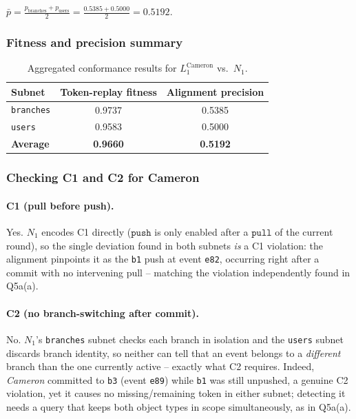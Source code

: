 \documentclass[11pt,a4paper]{article}
\newcommand{\otBranches}{\texttt{branches}}
\newcommand{\otUsers}{\texttt{users}}
\newcommand{\etPull}{\texttt{pull}}
\newcommand{\etPush}{\texttt{push}}
\newcommand{\None}{$N_1$}
\newcommand{\userCameron}{\textit{Cameron}}
\newcommand{\logLuone}{$L_1^{\text{Cameron}}$}
\begin{document}
$\bar{p} = \frac{p_{\text{branches}} + p_{\text{users}}}{2}
      = \frac{0.5385 + 0.5000}{2} = 0.5192$.

\subsubsection*{Fitness and precision summary}

\begin{table}[H]
      \centering\small
      \caption{Aggregated conformance results for \logLuone{} vs.\ \None.}
      \label{tab:conformance-summary}
      \begin{tabular}{@{}lcc@{}}
            \toprule
            \textbf{Subnet}  & \textbf{Token-replay fitness} & \textbf{Alignment precision} \\
            \midrule
            \otBranches      & 0.9737                        & 0.5385                       \\
            \otUsers         & 0.9583                        & 0.5000                       \\
            \midrule
            \textbf{Average} & \textbf{0.9660}               & \textbf{0.5192}              \\
            \bottomrule
      \end{tabular}
\end{table}

\subsubsection*{Checking C1 and C2 for Cameron}

\paragraph{C1 (pull before push).}
Yes. \None{} encodes C1 directly ($\etPush$ is only enabled after a $\etPull$ of
the current round), so the single deviation found in both subnets \emph{is} a C1
violation: the alignment pinpoints it as the \texttt{b1} push at event
\texttt{e82}, occurring right after a commit with no intervening pull -- matching
the violation independently found in Q5a(a).

\paragraph{C2 (no branch-switching after commit).}
No. \None's \otBranches{} subnet checks each branch in isolation and the
\otUsers{} subnet discards branch identity, so neither can tell that an event
belongs to a \emph{different} branch than the one currently active -- exactly
what C2 requires. Indeed, \userCameron{} committed to \texttt{b3} (event
\texttt{e89}) while \texttt{b1} was still unpushed, a genuine C2 violation, yet
it causes no missing/remaining token in either subnet; detecting it needs a query
that keeps both object types in scope simultaneously, as in Q5a(a).
\end{document}
